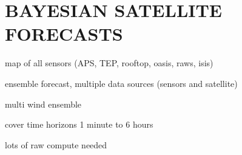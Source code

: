 \chapter{BAYESIAN SATELLITE FORECASTS}

map of all sensors (APS, TEP, rooftop, oasis, raws, isis)

ensemble forecast, multiple data sources (sensors and satellite)

multi wind ensemble

cover time horizons 1 minute to 6 hours

lots of raw compute needed

